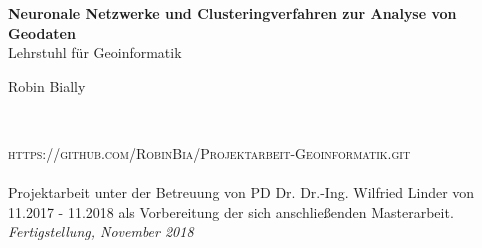 \documentclass[11pt,ceqn]{book}
\begin{document}

\begingroup
\thispagestyle{empty}
\centering
\vspace*{5cm}
\par\normalfont\fontsize{35}{35}\sffamily\selectfont
\textbf{{\color{white} Neuronale Netzwerke und Clusteringverfahren zur Analyse von Geodaten}}\\
{\LARGE {\color{white}Lehrstuhl für Geoinformatik}}\par
\vspace*{1cm}
{\Huge {\color{white} Robin Bially}}\par 
\endgroup


\newpage
~\vfill
\thispagestyle{empty}

\noindent \textsc{https://github.com/RobinBia/Projektarbeit-Geoinformatik.git}\\ \\ %

\noindent Projektarbeit unter der Betreuung von PD Dr. Dr.-Ing. Wilfried Linder von 11.2017 - 11.2018 als Vorbereitung der sich anschließenden Masterarbeit.\\ %

\noindent \textit{Fertigstellung, November 2018} 


\raggedright


\pagestyle{empty} %

\tableofcontents %


\pagestyle{fancy} %


\end{document}
